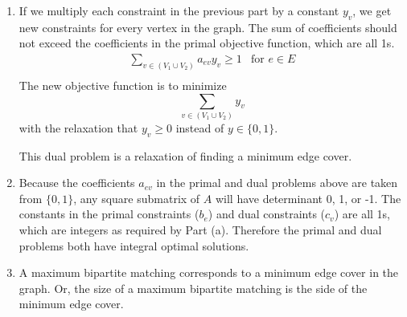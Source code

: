 \documentclass[12pt]{article}
\begin{document}
\begin{enumerate}
\item %
If we multiply each constraint in the previous part by a constant $y_v$, we
get new constraints for every vertex in the graph. The sum of coefficients
should not exceed the coefficients in the primal objective function, which
are all 1s.
%
\begin{eqnarray*}
\sum_{v \in (V_1 \cup V_2)} a_{ev}y_v \ge 1 & \textrm{for $e \in E$}\\
\end{eqnarray*}
%
The new objective function is to minimize
%
\begin{displaymath}
\sum_{v \in (V_1 \cup V_2)} y_v
\end{displaymath}
%
with the relaxation that $y_v \ge 0$ instead of $y \in \{0,1\}$.

This dual problem is a relaxation of finding a minimum edge cover.

\item %
Because the coefficients $a_{ev}$ in the primal and dual problems above
are taken from $\{0,1\}$, any square submatrix of $A$ will have determinant
0, 1, or -1. The constants in the primal constraints ($b_e$) and
dual constraints ($c_v$) are all 1s, which are integers as required by
Part (a). Therefore the primal and dual problems both have integral
optimal solutions.

\item %
A maximum bipartite matching corresponds to a minimum edge cover in the
graph. Or, the size of a maximum bipartite matching is the side of the
minimum edge cover.

\end{enumerate}

\pagebreak

\end{document}
